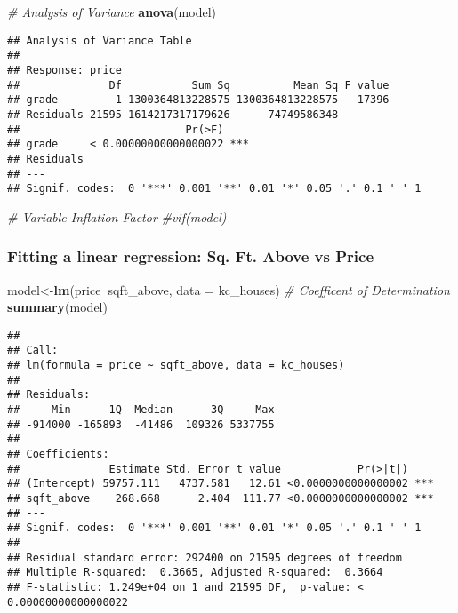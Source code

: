 \documentclass[]{article}
\newenvironment{Shaded}{\begin{snugshade}}{\end{snugshade}}
\newcommand{\CommentTok}[1]{\textcolor[rgb]{0.56,0.35,0.01}{\textit{#1}}}
\newcommand{\DataTypeTok}[1]{\textcolor[rgb]{0.13,0.29,0.53}{#1}}
\newcommand{\KeywordTok}[1]{\textcolor[rgb]{0.13,0.29,0.53}{\textbf{#1}}}
\newcommand{\NormalTok}[1]{#1}
\newcommand{\OperatorTok}[1]{\textcolor[rgb]{0.81,0.36,0.00}{\textbf{#1}}}
\begin{document}
\begin{Shaded}
\begin{Highlighting}[]
\CommentTok{# Analysis of Variance}
\KeywordTok{anova}\NormalTok{(model)}
\end{Highlighting}
\end{Shaded}

\begin{verbatim}
## Analysis of Variance Table
## 
## Response: price
##              Df           Sum Sq          Mean Sq F value
## grade         1 1300364813228575 1300364813228575   17396
## Residuals 21595 1614217317179626      74749586348        
##                          Pr(>F)    
## grade     < 0.00000000000000022 ***
## Residuals                          
## ---
## Signif. codes:  0 '***' 0.001 '**' 0.01 '*' 0.05 '.' 0.1 ' ' 1
\end{verbatim}

\begin{Shaded}
\begin{Highlighting}[]
\CommentTok{# Variable Inflation Factor}
\CommentTok{#vif(model)}
\end{Highlighting}
\end{Shaded}

\hypertarget{fitting-a-linear-regression-sq.-ft.-above-vs-price}{%
\subsubsection{Fitting a linear regression: Sq. Ft. Above vs
Price}\label{fitting-a-linear-regression-sq.-ft.-above-vs-price}}

\begin{Shaded}
\begin{Highlighting}[]
\NormalTok{model<-}\KeywordTok{lm}\NormalTok{(price}\OperatorTok{~}\NormalTok{sqft_above, }\DataTypeTok{data =}\NormalTok{ kc_houses)}
\CommentTok{# Coefficent of Determination}
\KeywordTok{summary}\NormalTok{(model)}
\end{Highlighting}
\end{Shaded}

\begin{verbatim}
## 
## Call:
## lm(formula = price ~ sqft_above, data = kc_houses)
## 
## Residuals:
##     Min      1Q  Median      3Q     Max 
## -914000 -165893  -41486  109326 5337755 
## 
## Coefficients:
##              Estimate Std. Error t value            Pr(>|t|)    
## (Intercept) 59757.111   4737.581   12.61 <0.0000000000000002 ***
## sqft_above    268.668      2.404  111.77 <0.0000000000000002 ***
## ---
## Signif. codes:  0 '***' 0.001 '**' 0.01 '*' 0.05 '.' 0.1 ' ' 1
## 
## Residual standard error: 292400 on 21595 degrees of freedom
## Multiple R-squared:  0.3665, Adjusted R-squared:  0.3664 
## F-statistic: 1.249e+04 on 1 and 21595 DF,  p-value: < 0.00000000000000022
\end{verbatim}
\end{document}
